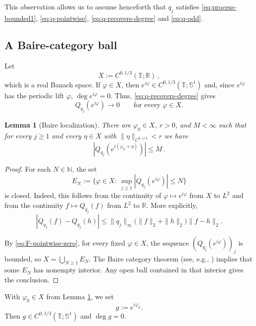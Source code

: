 \documentclass[11pt]{amsart}
\newtheorem{lemma}[theorem]{Lemma}
\theoremstyle{definition}
\theoremstyle{remark}
\newcommand{\T}{\mathbb T}
\newcommand{\Sone}{\mathbb S^1}
\newcommand{\R}{\mathbb R}
\newcommand{\N}{\mathbb N}
\DeclareMathOperator{\degmap}{deg}
\begin{document}
This observation allows us to assume henceforth that $q_j$ satisfies \eqref{eq:process-bounded1}, \eqref{eq:q-pointwise}, \eqref{eq:q-recovers-degree} and \eqref{eq:q-odd}.


\subsection{A Baire-category ball}

Let
\[
 X:=C^{0,1/3}(\T;\R) \,,
\]
which is a real Banach space. If $\varphi\in X$, then $e^{i\varphi}\in C^{0,1/3}(\T;\Sone)$ and, since $e^{i\varphi}$ has the periodic lift $\varphi$, $\deg e^{i\varphi}=0$. Thus, \eqref{eq:q-recovers-degree} gives
\begin{equation}\label{eq:F-pointwise-zero}
 Q_{q_j}(e^{i\varphi})\longrightarrow0
 \qquad\text{for every }\varphi\in X.
\end{equation}

\begin{lemma}[Baire localization]\label{lem:baire-ball}
There are $\varphi_0\in X$, $r>0$, and $M<\infty$ such that for every $j\geq1$ and every $\eta\in X$ with $\|\eta\|_{C^{0,1/3}}<r$ we have
\begin{equation}\label{eq:baire-bound}
 |Q_{q_j}(e^{i(\varphi_0+\eta)})|\leq M \,.
\end{equation}
\end{lemma}

\begin{proof}
For each $N\in\N$, the set
\[
 E_N:=\{\varphi\in X: \ \sup_{j\geq1}|Q_{q_j}(e^{i\varphi})|\leq N\}
\]
is closed. Indeed, this follows from the continuity of $\varphi\mapsto e^{i\varphi}$ from $X$ to $L^2$ and from the continuity $f\mapsto Q_{q_j}(f)$ from $L^2$ to $\R$. More explicitly,
\[
 |Q_{q_j}(f)-Q_{q_j}(h)|
 \leq \|q_j\|_\infty
 \big(\|f\|_2+\|h\|_2\big)\|f-h\|_2.
\]

By \eqref{eq:F-pointwise-zero}, for every fixed $\varphi\in X$, the sequence $(Q_{q_j}(e^{i\varphi}))_j$ is bounded, so $X=\bigcup_{N\geq1}E_N$.  The Baire category theorem (see, e.g., \cite[Theorem 5.1]{VanNeerven2022}) implies that some $E_N$ has nonempty interior.  Any open ball contained in that interior gives the conclusion.
\end{proof}

With $\varphi_0\in X$ from Lemma \ref{lem:baire-ball}, we set
\begin{equation}\label{eq:g-center}
 g:=e^{i\varphi_0}.
\end{equation}
Then $g\in C^{0,1/3}(\T;\Sone)$ and $\degmap g=0$.
\end{document}
